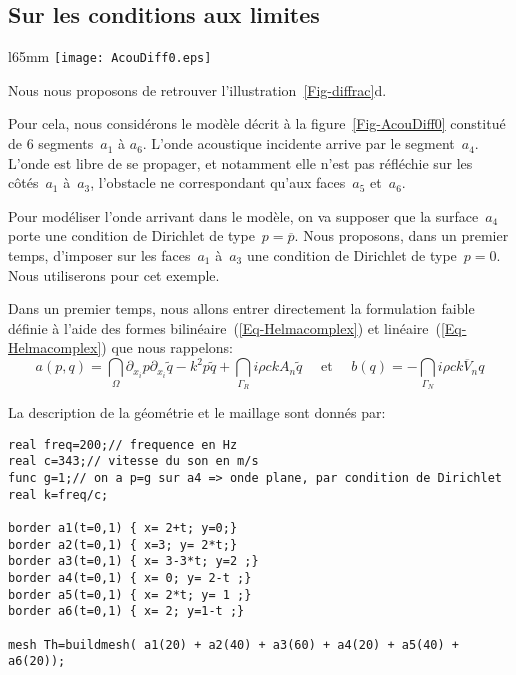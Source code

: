 \medskip
\subsection{Sur les conditions aux limites}

\begin{wrapfigure}{l}{65mm}
\centering
\texttt{[image: AcouDiff0.eps]}
\caption{Acoustique et obstacle}\label{Fig-AcouDiff0}
\end{wrapfigure}
Nous nous proposons de retrouver l'illustration~\ref{Fig-diffrac}d.

Pour cela, nous considérons le modèle décrit à la figure~\ref{Fig-AcouDiff0} constitué de 6 segments~$a_1$ à $a_6$. L'onde acoustique incidente arrive par le segment~$a_4$. L'onde est libre de se propager, et notamment elle n'est pas réfléchie sur les côtés~$a_1$ à~$a_3$, l'obstacle ne correspondant qu'aux faces~$a_5$ et~$a_6$.

Pour modéliser l'onde arrivant dans le modèle, on va supposer que la surface~$a_4$ porte une condition de Dirichlet de type~$p=\overline{p}$.
Nous proposons, dans un premier temps, d'imposer sur les faces~$a_1$ à~$a_3$ une condition de Dirichlet de type~$p=0$.
Nous utiliserons \freefem pour cet exemple.

Dans un premier temps, nous allons entrer directement la formulation faible définie à l'aide des formes bilinéaire~(\ref{Eq-Helmacomplex}) et linéaire~(\ref{Eq-Helmacomplex}) que nous rappelons:
\begin{equation}\label{Eq-Helmab}
a(p,q)=\dint_\Omega \partial_{x_i}p\partial_{x_i}\tilde{q}-k^2p\tilde{q} +
\dint_{\Gamma_R} i\rho ckA_n\tilde{q}
\quad \text{ et } \quad
b(q)=-\dint_{\Gamma_N} i\rho c k\overline{V}_n q
\end{equation}

\medskip
La description de la géométrie et le maillage sont donnés par:
\lstset{language=freefem++}
\begin{lstlisting}
real freq=200;// frequence en Hz
real c=343;// vitesse du son en m/s
func g=1;// on a p=g sur a4 => onde plane, par condition de Dirichlet
real k=freq/c;

border a1(t=0,1) { x= 2+t; y=0;}
border a2(t=0,1) { x=3; y= 2*t;}
border a3(t=0,1) { x= 3-3*t; y=2 ;}
border a4(t=0,1) { x= 0; y= 2-t ;}
border a5(t=0,1) { x= 2*t; y= 1 ;}
border a6(t=0,1) { x= 2; y=1-t ;}

mesh Th=buildmesh( a1(20) + a2(40) + a3(60) + a4(20) + a5(40) + a6(20));
\end{lstlisting}

